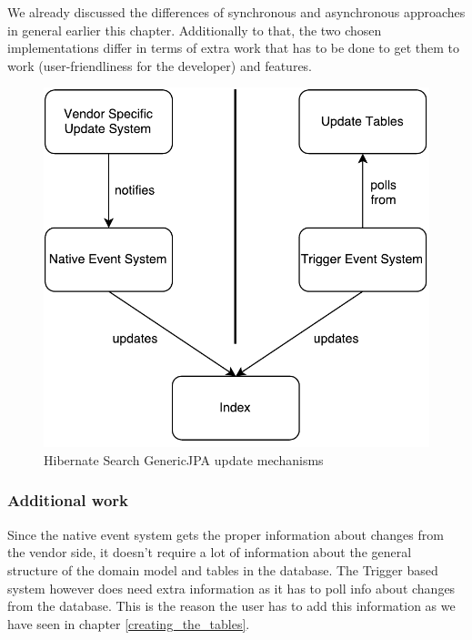 We already discussed the differences of synchronous and asynchronous approaches in general earlier this chapter. Additionally to that, the two chosen implementations differ in terms of extra work that has to be done to get them to work (user-friendliness for the developer) and features.
\\
\begin{figure}[ht]
	\centering
	\includegraphics[scale=0.6]{images/UpdateConsumer_Architecture.pdf}
	\caption{Hibernate Search GenericJPA update mechanisms}
	\label{updateconsumer_architecture}
\end{figure}

\subsubsection{Additional work}
Since the native event system gets the proper information about changes from the vendor side, it doesn't require a lot of information about the general structure of the domain model and tables in the database. The Trigger based system however does need extra information as it has to poll info about changes from the database. This is the reason the user has to add this information as we have seen in chapter \ref{creating_the_tables}.

\pagebreak

